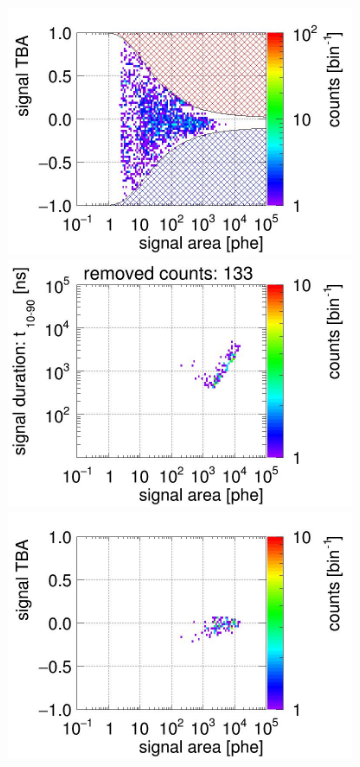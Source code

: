 \begin{landscape}
\begin{figure}[!p]
\begin{subfigure}[t]{0.33\textwidth}
		\includegraphics[width=\figurewidth,clip,trim={0 98 0 40}]{Figures/GasTest/CutsValid/res64767/tbapa12Vecfig64767.jpg}
		\includegraphics[width=\figurewidth,clip,trim={0 98 0 10}]{Figures/GasTest/CutsValid/res64767/pdpaX12Vecfig64767.jpg}
		\includegraphics[width=\figurewidth,clip,trim={0 0 0 40}]{Figures/GasTest/CutsValid/res64767/tbapaX12Vecfig64767.jpg}

\end{subfigure}
\end{figure}
\end{landscape}
